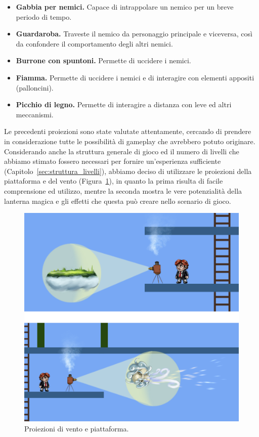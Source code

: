\begin{itemize}
	\item \textbf{Gabbia per nemici.} Capace di intrappolare un nemico per un breve periodo di tempo.
	
	\item \textbf{Guardaroba.} Traveste il nemico da personaggio principale e viceversa, così da confondere il comportamento degli altri nemici.
	
	\item \textbf{Burrone con spuntoni.} Permette di uccidere i nemici.
	
	\item \textbf{Fiamma.} Permette di uccidere i nemici e di interagire con elementi appositi (palloncini).
	
	\item \textbf{Picchio di legno.} Permette di interagire a distanza con leve ed altri meccanismi.
\end{itemize}

Le precedenti proiezioni sono state valutate attentamente, cercando di prendere in considerazione tutte le possibilità di gameplay che avrebbero potuto originare.
Considerando anche la struttura generale di gioco ed il numero di livelli che abbiamo stimato fossero necessari per fornire un’esperienza sufficiente (Capitolo~\ref{sec:struttura_livelli}), abbiamo deciso di utilizzare le proiezioni della piattaforma e del vento (Figura~\ref{fig:meccaniche_precinema_piattaforma_vento}), in quanto la prima risulta di facile comprensione ed utilizzo, mentre la seconda mostra le vere potenzialità della lanterna magica e gli effetti che questa può creare nello scenario di gioco.

\begin{figure}%
	\centering
	\includegraphics[width= 0.85\columnwidth]{images/gameDesign/18_piattaforma_vento.jpg}
	\caption{Proiezioni di vento e piattaforma.}
	\label{fig:meccaniche_precinema_piattaforma_vento}
\end{figure}

